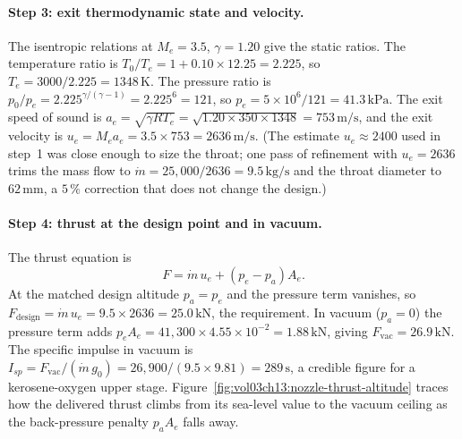 \paragraph{Step 3: exit thermodynamic state and velocity.} The
isentropic relations at $M_e = 3.5$, $\gamma = 1.20$ give the static
ratios. The temperature ratio is
$T_0/T_e = 1 + 0.10\times 12.25 = 2.225$, so
$T_e = 3000/2.225 = 1348\,\si{\kelvin}$. The pressure ratio is
$p_0/p_e = 2.225^{\gamma/(\gamma - 1)} = 2.225^{6} = 121$, so
$p_e = 5\times 10^{6}/121 = 41.3\,\text{kPa}$. The exit speed of sound
is $a_e = \sqrt{\gamma R T_e} = \sqrt{1.20\times 350\times 1348} =
753\,\si{\meter\per\second}$, and the exit velocity is
$u_e = M_e a_e = 3.5\times 753 = 2636\,\si{\meter\per\second}$. (The
estimate $u_e \approx 2400$ used in step~1 was close enough to size
the throat; one pass of refinement with $u_e = 2636$ trims the mass
flow to $\dot m = 25{,}000/2636 = 9.5\,\si{\kilogram\per\second}$ and
the throat diameter to $62\,\si{\milli\meter}$, a $5\,\%$ correction
that does not change the design.)

\paragraph{Step 4: thrust at the design point and in vacuum.} The
thrust equation is
\[
F = \dot m\,u_e + (p_e - p_a)A_e.
\]
At the matched design altitude $p_a = p_e$ and the pressure term
vanishes, so $F_{\text{design}} = \dot m\,u_e = 9.5\times 2636 =
25.0\,\text{kN}$, the requirement. In vacuum ($p_a = 0$) the pressure
term adds $p_e A_e = 41{,}300\times 4.55\times 10^{-2} = 1.88\,\text{
kN}$, giving $F_{\text{vac}} = 26.9\,\text{kN}$. The specific impulse
in vacuum is $I_{sp} = F_{\text{vac}}/(\dot m\,g_0) =
26{,}900/(9.5\times 9.81) = 289\,\si{\second}$, a credible figure for a
kerosene-oxygen upper stage.
Figure~\ref{fig:vol03ch13:nozzle-thrust-altitude} traces how the
delivered thrust climbs from its sea-level
value to the vacuum ceiling as the back-pressure penalty $p_a A_e$
falls away.



